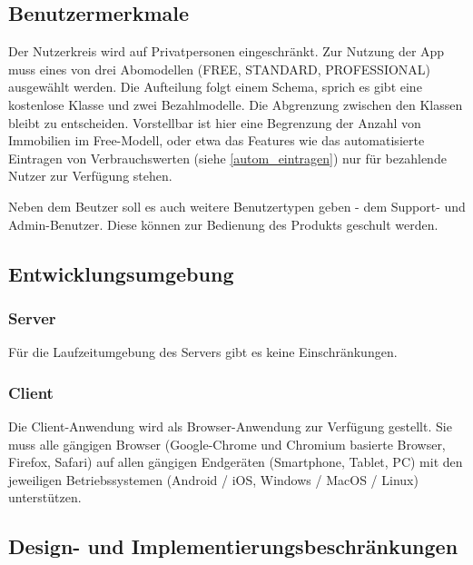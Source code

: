\subsection{Benutzermerkmale}\label{sec:desc_user}

Der Nutzerkreis wird auf Privatpersonen eingeschränkt.
Zur Nutzung der App muss eines von drei Abomodellen (FREE, STANDARD, PROFESSIONAL) ausgewählt werden.
Die Aufteilung folgt einem  Schema, sprich es gibt eine kostenlose Klasse und zwei Bezahlmodelle. Die Abgrenzung zwischen den Klassen bleibt zu entscheiden. Vorstellbar ist hier eine Begrenzung der Anzahl von Immobilien im Free-Modell, oder etwa das Features wie das automatisierte Eintragen von Verbrauchswerten (siehe \ref{autom_eintragen}) nur für bezahlende Nutzer zur Verfügung stehen. %

Neben dem Beutzer soll es auch weitere Benutzertypen geben - dem Support- und Admin-Benutzer. Diese können zur Bedienung des Produkts geschult werden.

\subsection{Entwicklungsumgebung}

\subsubsection{Server}

Für die Laufzeitumgebung des Servers gibt es keine Einschränkungen.

\subsubsection{Client}
\label{subsec:OEclient}
Die Client-Anwendung wird als Browser-Anwendung zur Verfügung gestellt. Sie muss alle gängigen Browser (Google-Chrome und Chromium basierte Browser, Firefox, Safari) auf allen gängigen Endgeräten (Smartphone, Tablet, PC) mit den jeweiligen Betriebssystemen (Android / iOS, Windows / MacOS / Linux) unterstützen.

\subsection{Design- und Implementierungsbeschränkungen}

